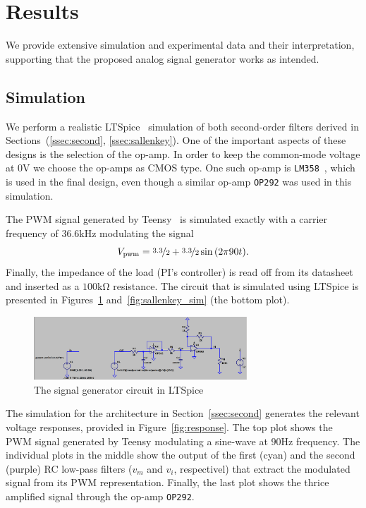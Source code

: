 \vspace{-1em}
\section{Results}
\label{sec:results}
\vspace{-1em}

We provide extensive simulation and experimental data and their interpretation,
supporting that the proposed analog signal generator works as intended.

\vspace{-1em}
\subsection{Simulation}
\vspace{-1em}

We perform a realistic LTSpice~\cite{ltspice} simulation of both second-order
filters derived in Sections~(\ref{ssec:second}, \ref{ssec:sallenkey}). One of
the important aspects of these designs is the selection of the op-amp. In order
to keep the common-mode voltage at $0$\unit{\volt} we choose the op-amps as CMOS
type. One such op-amp is \texttt{LM358}~\cite{lm358}, which is used in the final
design, even though a similar op-amp \texttt{OP292} was used in this simulation.

The PWM signal generated by Teensy~\cite{teensy} is simulated exactly with a
carrier frequency of $36.6$\unit{\kilo\hertz} modulating the signal \[
V_{\text{pwm}} = \nicefrac{3.3}{2} + \nicefrac{3.3}{2}\sin{(2\pi 90 t)}.\]
Finally, the impedance of the load (PI's controller) is read off from its
datasheet and inserted as a $100$\unit{\kilo\ohm} resistance. The circuit that
is simulated using LTSpice is presented in Figures~\ref{fig:real_sig_gen}
and~\ref{fig:sallenkey_sim} (the bottom plot).

\begin{figure}[htb] 
\includegraphics[width=8cm]{./figures/circuit.png}
\caption{The signal generator circuit in LTSpice} 
\label{fig:real_sig_gen}
\end{figure}

The simulation for the architecture in Section~\ref{ssec:second} generates the
relevant voltage responses, provided in Figure~\ref{fig:response}. The top plot
shows the PWM signal generated by Teensy modulating a sine-wave at
$90$\unit{\hertz} frequency. The individual plots in the middle show the output
of the first (cyan) and the second (purple) RC low-pass filters ($v_m$ and
$v_i$, respectivel) that extract the modulated signal from its PWM
representation. Finally, the last plot shows the thrice amplified signal through
the op-amp \texttt{OP292}.


